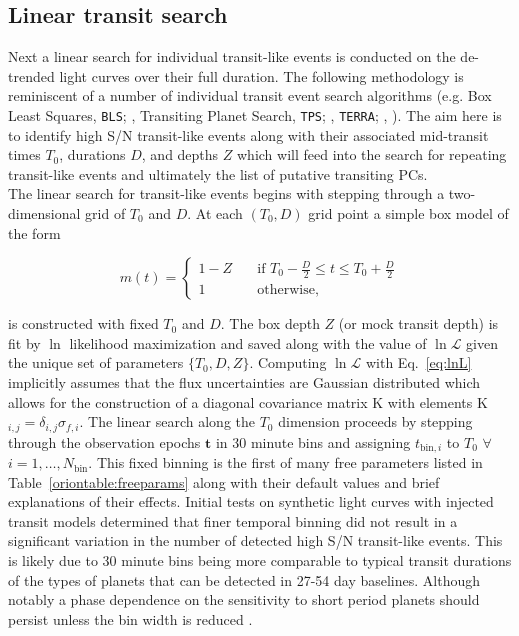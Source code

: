 \subsection{Linear transit search} \label{sect:linearsearch}
Next a linear search for individual transit-like events is conducted on the de-trended light curves over
their full duration. The following methodology is reminiscent of a number of individual transit event
search algorithms
(e.g. Box Least Squares, \texttt{BLS}; \citealt{kovacs02}, Transiting Planet Search, \texttt{TPS};
\citealt{jenkins10,christiansen13,christiansen15,christiansen16}, \texttt{TERRA};
\citealt{petigura13a}, \citealt{foremanmackey15a}). The aim here is
to identify high S/N transit-like events along with their associated mid-transit times $T_0$,
durations $D$, and depths $Z$ which will feed into the search for repeating transit-like
events and ultimately the list of putative transiting PCs. \\

The linear search for transit-like events begins with stepping through
a two-dimensional grid of $T_0$ and $D$. At each $(T_0,D)$ grid point a simple box model of the form

\begin{equation}
  m(t) =
  \begin{cases}
    1-Z & \quad \text{if } T_0-\frac{D}{2} \leq t \leq T_0+\frac{D}{2} \\
    1 & \quad \text{otherwise,}
  \end{cases}
  \label{eq:boxx}
\end{equation}

\noindent is constructed with fixed $T_0$ and $D$. The box depth $Z$ (or mock transit depth)
is fit by $\ln$ likelihood maximization and saved along with the value of $\ln{\mathcal{L}}$
given the unique set of parameters $\{T_0,D,Z\}$. Computing $\ln{\mathcal{L}}$ with Eq.~\ref{eq:lnL}
implicitly assumes that the flux uncertainties are Gaussian distributed which allows for the
construction of a diagonal covariance matrix K with elements K$_{i,j} = \delta_{i,j} \sigma_{f,i}$.
The linear search along the $T_0$ dimension proceeds by stepping through the observation epochs
$\mathbf{t}$ in 30 minute bins and assigning
$t_{\text{bin},i}$ to $T_0$ $\forall$ $i=1,\dots,N_{\text{bin}}$.
This fixed binning is the first of many \pipeline{} free parameters listed in
Table~\ref{oriontable:freeparams} along with their default values and brief explanations of their
effects. Initial \pipeline{} tests on synthetic light curves with injected transit models
determined that finer temporal binning did not result in a significant variation in the number
of detected high S/N transit-like events. This is likely due to 30 minute bins being more comparable
to typical transit durations of the types of planets that can be detected in 27-54 day baselines.
Although notably a phase dependence on the sensitivity to short period planets should persist
unless the bin width is reduced \citep{kovacs02}. \\

